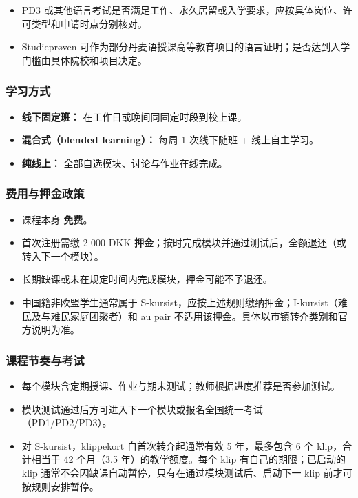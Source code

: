 \begin{itemize}
    \item PD3 或其他语言考试是否满足工作、永久居留或入学要求，应按具体岗位、许可类型和申请时点分别核对。
    \item Studieprøven 可作为部分丹麦语授课高等教育项目的语言证明；是否达到入学门槛由具体院校和项目决定。
\end{itemize}

\subsubsection{学习方式}
\begin{itemize}
    \item \textbf{线下固定班：} 在工作日或晚间同固定时段到校上课。
    \item \textbf{混合式（blended learning）：} 每周 1 次线下随班 + 线上自主学习。
    \item \textbf{纯线上：} 全部自选模块、讨论与作业在线完成。
\end{itemize}

\subsubsection{费用与押金政策}
\begin{itemize}
    \item 课程本身 \textbf{免费}。
    \item 首次注册需缴 2 000 DKK \textbf{押金}；按时完成模块并通过测试后，全额退还（或转入下一个模块）。
    \item 长期缺课或未在规定时间内完成模块，押金可能不予退还。
    \item 中国籍非欧盟学生通常属于 S-kursist，应按上述规则缴纳押金；I-kursist（难民及与难民家庭团聚者）和 au pair 不适用该押金。具体以市镇转介类别和官方说明为准。
\end{itemize}

\subsubsection{课程节奏与考试}
\begin{itemize}
    \item 每个模块含定期授课、作业与期末测试；教师根据进度推荐是否参加测试。
    \item 模块测试通过后方可进入下一个模块或报名全国统一考试（PD1/PD2/PD3）。
    \item 对 S-kursist，klippekort 自首次转介起通常有效 5 年，最多包含 6 个 klip，合计相当于 42 个月（3.5 年）的教学额度。每个 klip 有自己的期限；已启动的 klip 通常不会因缺课自动暂停，只有在通过模块测试后、启动下一 klip 前才可按规则安排暂停。
\end{itemize}

